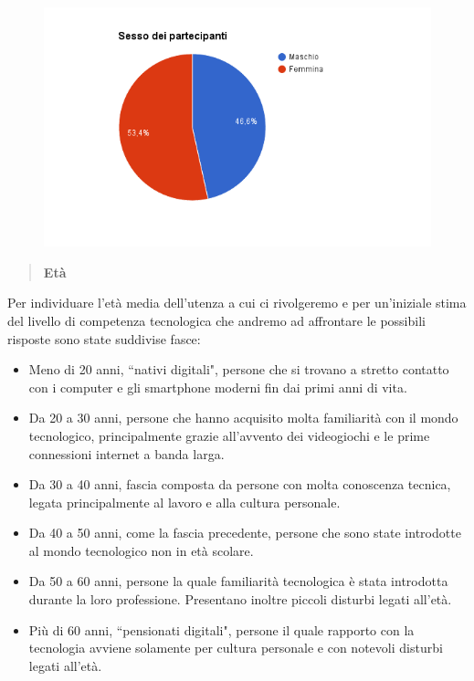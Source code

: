 \begin{figure}[H]
	\centering
	\includegraphics[scale=0.6]{img/chart_sesso}
\end{figure}

\begin{quote}
	\textbf{Età}
\end{quote}
Per individuare l'età media dell'utenza a cui ci rivolgeremo e per un'iniziale stima del livello
di competenza tecnologica che andremo ad affrontare le possibili risposte sono
state suddivise fasce:
\begin{itemize}
		\item Meno di 20 anni, ``nativi digitali", persone che si
			trovano a stretto contatto con i computer e gli
			smartphone moderni fin dai primi anni di vita.

		\item Da 20 a 30 anni, persone che hanno acquisito molta
			familiarità con il mondo tecnologico, principalmente
			grazie all'avvento dei videogiochi e le prime connessioni
			internet a banda larga.

		\item Da 30 a 40 anni, fascia composta da persone con molta conoscenza tecnica,
			legata principalmente al lavoro e alla cultura
			personale.

		\item Da 40 a 50 anni, come la fascia precedente, persone che
			sono state introdotte al mondo tecnologico non in età
			scolare.

		\item Da 50 a 60 anni, persone la quale familiarità tecnologica è
			stata introdotta durante la loro professione.
			Presentano inoltre piccoli disturbi legati all'età.

		\item Più di 60 anni, ``pensionati digitali",  persone il quale rapporto con la
			tecnologia avviene solamente per cultura personale e con
			notevoli disturbi legati all'età.
\end{itemize}

